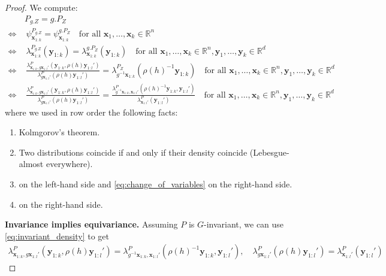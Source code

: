 \begin{proof}
	We compute: \begin{align} &P_{g.Z}=g.P_{Z} \\ \Leftrightarrow \,& \, \psi^{P_{g.Z}}_{\mathbf{x}_{1:k}}=\psi^{g.P_{Z}}_{\mathbf{x}_{1:k}} \quad\text{for all }\mathbf{x}_1,\dots,\mathbf{x}_k\in\mathbb{R}^n\\ \Leftrightarrow \,& \,\lambda^{P_{g.Z}}_{\mathbf{x}_{1:k}}(\mathbf{y}_{1:k})=\lambda^{g.P_{Z}}_{\mathbf{x}_{1:k}}(\mathbf{y}_{1:k}) \quad\text{for all }\mathbf{x}_1,\dots,\mathbf{x}_k\in\mathbb{R}^n,\mathbf{y}_1,\dots,\mathbf{y}_k\in\mathbb{R}^d\\ \Leftrightarrow \,& \,\frac{\lambda_{\mathbf{x}_{1:k},g\mathbf{x}_{1:l}'}^P(\mathbf{y}_{1:k},\rho(h)\mathbf{y}_{1:l}')}{ \lambda_{g\mathbf{x}_{1:l}'}^{P}(\rho(h)\mathbf{y}_{1:l}') }=\lambda_{g^{-1}\mathbf{x}_{1:k}}^{P_Z}(\rho(h)^{-1}\mathbf{y}_{1:k}) \quad\text{for all }\mathbf{x}_1,\dots,\mathbf{x}_k\in\mathbb{R}^n,\mathbf{y}_1,\dots,\mathbf{y}_k\in\mathbb{R}^d\\ \Leftrightarrow \,& \,\label{eq:equivariance_in_marginals} \frac{\lambda_{\mathbf{x}_{1:k},g\mathbf{x}_{1:l}'}^P(\mathbf{y}_{1:k},\rho(h)\mathbf{y}_{1:l}')}{ \lambda_{g\mathbf{x}_{1:l}'}^{P}(\rho(h)\mathbf{y}_{1:l}') }=\frac{\lambda_{g^{-1}\mathbf{x}_{1:k},\mathbf{x}_{1:l}'}^P(\rho(h)^{-1}\mathbf{y}_{1:k},\mathbf{y}_{1:l}')}{ \lambda_{\mathbf{x}_{1:l}'}^{P}(\mathbf{y}_{1:l}') } \quad\text{for all }\mathbf{x}_1,\dots,\mathbf{x}_k\in\mathbb{R}^n,\mathbf{y}_1,\dots,\mathbf{y}_k\in\mathbb{R}^d \end{align} where we used in row order the following facts: \begin{enumerate} \item Kolmgorov's theorem.
		\item Two distributions coincide if and only if their density coincide (Lebesgue-almost everywhere).
		\item {} on the left-hand side and \cref{eq:change_of_variables} on the right-hand side.
		\item {} on the right-hand side.
	\end{enumerate}

	\textbf{Invariance implies equivariance.}
	Assuming $P$ is $G$-invariant, we can use \cref{eq:invariant_density} to get \begin{align*} \lambda_{\mathbf{x}_{1:k},g\mathbf{x}_{1:l}'}^P(\mathbf{y}_{1:k},\rho(h)\mathbf{y}_{1:l}')=\lambda_{g^{-1}\mathbf{x}_{1:k},\mathbf{x}_{1:l}'}^P(\rho(h)^{-1}\mathbf{y}_{1:k},\mathbf{y}_{1:l}'),\quad \lambda_{g\mathbf{x}_{1:l}'}^{P}(\rho(h)\mathbf{y}_{1:l}') =\lambda_{\mathbf{x}_{1:l}'}^{P}(\mathbf{y}_{1:l}') \end{align*} 


\end{proof}

